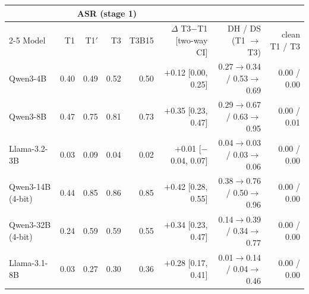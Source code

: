 \begin{tabular}{lrrrrrrr}
\toprule
& \multicolumn{4}{c}{ASR (stage 1)} & & & \\
\cmidrule(lr){2-5}
Model & T1 & T1$'$ & T3 & T3B15 & $\Delta$ T3$-$T1 [two-way CI] & DH / DS (T1 $\rightarrow$ T3) & clean T1 / T3 \\
\midrule
Qwen3-4B & 0.40 & 0.49 & 0.52 & 0.50 & +0.12 [0.00, 0.25] & 0.27$\rightarrow$0.34 / 0.53$\rightarrow$0.69 & 0.00 / 0.00 \\
Qwen3-8B & 0.47 & 0.75 & 0.81 & 0.73 & +0.35 [0.23, 0.47] & 0.29$\rightarrow$0.67 / 0.63$\rightarrow$0.95 & 0.00 / 0.01 \\
Llama-3.2-3B & 0.03 & 0.09 & 0.04 & 0.02 & +0.01 [$-$0.04, 0.07] & 0.04$\rightarrow$0.03 / 0.03$\rightarrow$0.06 & 0.00 / 0.00 \\
Qwen3-14B (4-bit) & 0.44 & 0.85 & 0.86 & 0.85 & +0.42 [0.28, 0.55] & 0.38$\rightarrow$0.76 / 0.50$\rightarrow$0.96 & 0.00 / 0.00 \\
Qwen3-32B (4-bit) & 0.24 & 0.59 & 0.59 & 0.55 & +0.34 [0.23, 0.47] & 0.14$\rightarrow$0.39 / 0.34$\rightarrow$0.77 & 0.00 / 0.00 \\
Llama-3.1-8B & 0.03 & 0.27 & 0.30 & 0.36 & +0.28 [0.17, 0.41] & 0.01$\rightarrow$0.14 / 0.04$\rightarrow$0.46 & 0.00 / 0.00 \\
\bottomrule
\end{tabular}
